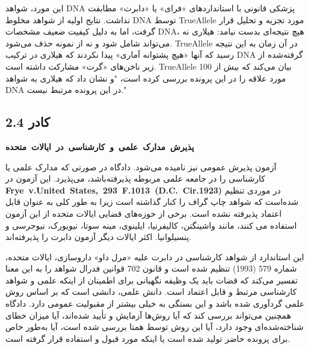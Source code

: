 این مورد، شواهد DNA پزشکی قانونی با استانداردهای «فرای» یا «دابرت» مطابقت نداشت.
نتایج اولیه از شواهد مخلوط DNA توسط TrueAllele مورد تجزیه و تحلیل قرار گرفت، اما به دلیل کیفیت ضعیف مشخصات DNA، هیچ نتیجه‌ای بدست نیامد: هیلاری نه می‌تواند شامل شود و نه از نمونه حذف می‌شود.
TrueAllele در آن زمان به این نتیجه رسید که آنها «هیچ پشتوانه آماری» پیدا نکردند که هیلاری در ترکیب DNA گرفته‌شده از زیر ناخن‌های «گرت» مشارکت داشته است.
TrueAllele بیان می‌کند که بیش از 100 مورد علاقه را در این پرونده بررسی کرده است، "و نشان داد که هیلاری به شواهد DNA در این پرونده مرتبط نیست."



\begin{tcolorbox}[colback=gray!10,colframe=black,breakable]

    \section*{کادر 2.4}
    \label{sec:کادر 2.4}
    \begin{Large}
        \textbf{\mbox{پذیرش مدارک علمی و کارشناسی در ایالات متحده}}
    \end{Large}
    \newline

    \begin{description}[leftmargin=0.5cm,style=nextline]
        \item[آزمون فرای:] آزمون پذیرش عمومی نیز نامیده می‌شود.
        دادگاه در صورتی که مدارک علمی یا کارشناسی را در جامعه علمی مربوطه پذیرفته‌باشد، می‌پذیرد.
        این آزمون در \textenglish{\mbox{\textbf{Frye v.United States, 293 F.1013 (D.C. Cir.1923)}}}  در موردی تنظیم شده‌است که شواهد چاپ گراف را کنار گذاشته است زیرا به طور کلی به عنوان قابل اعتماد پذیرفته نشده است.
        برخی از حوزه‌های قضایی ایالات متحده از این آزمون استفاده می کنند، مانند واشینگتن، کالیفرنیا، ایلینوی، مینه سوتا، نیویورک، نیوجرسی و پنسیلوانیا.
        اکثر ایالات دیگر آزمون دابرت را پذیرفته‌اند.

        \item[آزمون دابرت:] این استاندارد از شواهد کارشناسی در دابرت علیه «مرل داو» داروسازی، ایالات متحده، شماره 579 (1993) تنظیم شده است و قانون 702 قوانین فدرال شواهد را به این معنا تفسیر می‌کند که قضات باید یک وظیفه نگهبانی برای اطمینان از اینکه علمی و شواهد کارشناسی مرتبط و قابل اعتماد است.
        دانش علمی، دانشی است که بر اساس روش علمی گردآوری شده باشد و این بستگی به خیلی بیشتر از مقبولیت عمومی دارد.
        دادگاه همچنین می‌تواند بررسی کند که آیا روش‌ها آزمایش و تأیید شده‌اند، آیا میزان خطای شناخته‌شده‌ای وجود دارد، آیا این روش توسط همتا بررسی شده است، آیا به‌طور خاص برای پرونده حاضر تولید شده است یا اینکه مورد قبول و استفاده قرار گرفته است.
    \end{description}


\end{tcolorbox}
